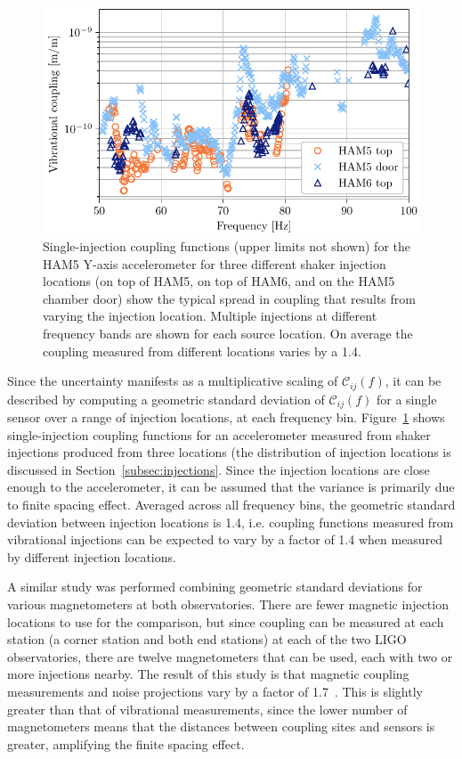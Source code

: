 \begin{figure}
	\centering
	\includegraphics[width=\textwidth]{figures/injection-locations.pdf}
	\caption{Single-injection coupling functions (upper limits not shown) for the HAM5 Y-axis accelerometer for three different shaker injection locations (on top of HAM5, on top of HAM6, and on the HAM5 chamber door) show the typical spread in coupling that results from varying the injection location. Multiple injections at different frequency bands are shown for each source location. On average the coupling measured from different locations varies by a 1.4.}
	\label{fig:injection_locations}
\end{figure}

Since the uncertainty manifests as a multiplicative scaling of $\mathcal{C}_{ij}(f)$, it can be described by computing a geometric standard deviation of $\mathcal{C}_{ij}(f)$ for a single sensor over a range of injection locations, at each frequency bin.
Figure~\ref{fig:injection_locations} shows single-injection coupling functions for an accelerometer measured from shaker injections produced from three locations (the distribution of injection locations is discussed in Section~\ref{subsec:injections}.
Since the injection locations are close enough to the accelerometer, it can be assumed that the variance is primarily due to finite spacing effect.
Averaged across all frequency bins, the geometric standard deviation between injection locations is 1.4, i.e. coupling functions measured from vibrational injections can be expected to vary by a factor of 1.4 when measured by different injection locations.

A similar study was performed combining geometric standard deviations for various magnetometers at both observatories.
There are fewer magnetic injection locations to use for the comparison, but since coupling can be measured at each station (a corner station and both end stations) at each of the two LIGO observatories, there are twelve magnetometers that can be used, each with two or more injections nearby.
The result of this study is that magnetic coupling measurements and noise projections vary by a factor of 1.7~\cite{cf_uncertainty}.
This is slightly greater than that of vibrational measurements, since the lower number of magnetometers means that the distances between coupling sites and sensors is greater, amplifying the finite spacing effect.

